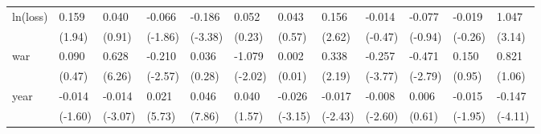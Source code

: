 \begin{tabular}{p{1.5cm} p{2cm} p{1.7cm} p{1.7cm} p{1.7cm} p{1.7cm} p{1.7cm} p{1.7cm} p{1.7cm} p{1.7cm} p{1.7cm} p{1.7cm}}
\hline
ln(loss)        &    0.159         &    0.040         &   -0.066         &   -0.186\sym{**} &    0.052         &    0.043         &    0.156\sym{*}  &   -0.014         &   -0.077         &   -0.019         &    1.047\sym{*}  \\
                &   (1.94)         &   (0.91)         &  (-1.86)         &  (-3.38)         &   (0.23)         &   (0.57)         &   (2.62)         &  (-0.47)         &  (-0.94)         &  (-0.26)         &   (3.14)         \\
war             &    0.090         &    0.628\sym{***}&   -0.210\sym{*}  &    0.036         &   -1.079         &    0.002         &    0.338         &   -0.257\sym{***}&   -0.471\sym{**} &    0.150         &    0.821         \\
                &   (0.47)         &   (6.26)         &  (-2.57)         &   (0.28)         &  (-2.02)         &   (0.01)         &   (2.19)         &  (-3.77)         &  (-2.79)         &   (0.95)         &   (1.06)         \\
year            &   -0.014         &   -0.014\sym{**} &    0.021\sym{***}&    0.046\sym{***}&    0.040         &   -0.026\sym{*}  &   -0.017\sym{*}  &   -0.008\sym{*}  &    0.006         &   -0.015         &   -0.147\sym{**} \\
                &  (-1.60)         &  (-3.07)         &   (5.73)         &   (7.86)         &   (1.57)         &  (-3.15)         &  (-2.43)         &  (-2.60)         &   (0.61)         &  (-1.95)         &  (-4.11)         \\
\end{tabular}
\def\sym#1{\ifmmode^{#1}\else\(^{#1}\)\fi}
